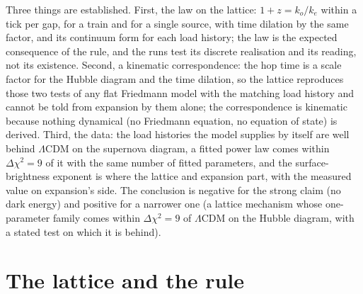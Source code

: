 \documentclass[11pt]{article}
\begin{document}
Three things are established. First, the law on the lattice: $1 + z = k_o /
k_e$ within a tick per gap, for a train and for a single source, with time
dilation by the same factor, and its continuum form for each load history;
the law is the expected consequence of the rule, and the runs test its
discrete realisation and its reading, not its existence.
Second, a kinematic correspondence: the hop time is a scale factor for the
Hubble diagram and the time dilation, so the lattice reproduces those two
tests of any flat Friedmann model with the matching load history and cannot be
told from expansion by them alone; the correspondence is kinematic because
nothing dynamical (no Friedmann equation, no equation of state) is derived.
Third, the data: the load histories the model supplies by itself are well
behind $\Lambda$CDM on the supernova diagram, a fitted power law comes
within $\Delta\chi^2 = 9$ of it with the same number of fitted parameters, and the surface-brightness
exponent is where the lattice and expansion part, with the measured value on
expansion's side. The conclusion is negative for the strong claim
(no dark energy) and positive for a narrower one (a lattice mechanism whose one-parameter
family comes within $\Delta\chi^2 = 9$ of $\Lambda$CDM on the Hubble
diagram, with a stated test on which it is behind).

\section{The lattice and the rule}\label{sec:rule}
\end{document}
